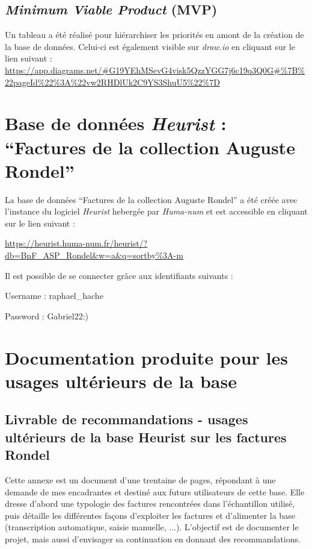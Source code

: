 \documentclass[12pt,twoside]{book}
\begin{document}
\section{\emph{Minimum Viable Product} (MVP)}

Un tableau a été réalisé pour hiérarchiser les priorités en amont de la création de la base de données. Celui-ci est également visible sur \emph{draw.io} en cliquant sur le lien suivant : \url{https://app.diagrams.net/#G19YEhMSevG4visk5QzzYGG7j6c19q3Q0G#%7B%22pageId%22%3A%22vw2RHDlUk2C9YS3ShuU5%22%7D}
\label{MVP}

\chapter{Base de données \emph{Heurist} : \enquote{Factures de la collection Auguste Rondel}}

La base de données \enquote{Factures de la collection Auguste Rondel} a été créée avec l'instance du logiciel \emph{Heurist} hebergée par \emph{Huma-num} et est accessible en cliquant sur le lien suivant :

\vspace{1,5cm}
\url{https://heurist.huma-num.fr/heurist/?db=BnF_ASP_Rondel&w=a&q=sortby%3A-m}

Il est possible de se connecter grâce aux identifiants suivants : 

Username : raphael\_hache

Password : Gabriel22:) 

\chapter{Documentation produite pour les usages ultérieurs de la base}
\section{Livrable de recommandations - usages ultérieurs de la base Heurist sur les factures Rondel}
\label{documentation}

Cette annexe est un document d'une trentaine de pages, répondant à une demande de mes encadrantes et destiné aux futurs utilisateurs de cette base. Elle dresse d'abord une typologie des factures rencontrées dans l'échantillon utilisé, puis détaille les différentes façons d'exploiter les factures et d'alimenter la base (transcription automatique, saisie manuelle, ...). L'objectif est de documenter le projet, mais aussi d'envisager sa continuation en donnant des recommandations. 
\end{document}
